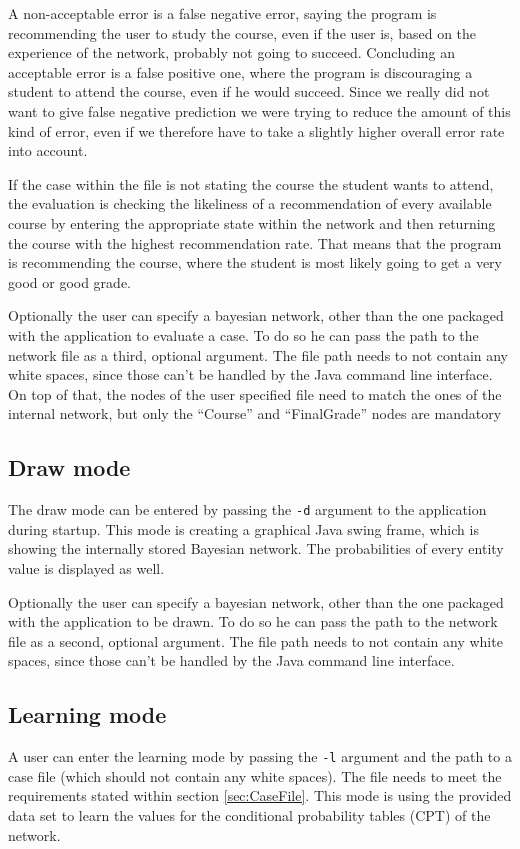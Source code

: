 \documentclass[%
	pdftex,
	oneside,        %
	11pt,           %
	parskip=half,   %
	headsepline,    %
	footsepline,    %
	abstracton,     %
	USenglish,      %
	a4paper,        %
]{report}
\begin{document}
A non-acceptable error is a false negative error, saying the program is recommending the user to study the course, even if the user is, based on the experience of the network, probably not going to succeed. Concluding an acceptable error is a false positive one, where the program is discouraging a student to attend the course, even if he would succeed. Since we really did not want to give false negative prediction we were trying to reduce the amount of this kind of error, even if we therefore have to take a slightly higher overall error rate into account.

If the case within the file is not stating the course the student wants to attend, the evaluation is checking the likeliness of a recommendation of every available course by entering the appropriate state within the network and then returning the course with the highest recommendation rate. That means that the program is recommending the course, where the student is most likely going to get a very good or good grade.

Optionally the user can specify a bayesian network, other than the one packaged with the application to evaluate a case. To do so he can pass the path to the network file as a third, optional argument. The file path needs to not contain any white spaces, since those can't be handled by the Java command line interface. On top of that, the nodes of the user specified file need to match the ones of the internal network, but only the \enquote{Course} and \enquote{FinalGrade} nodes are mandatory

\subsection{Draw mode}
The draw mode can be entered by passing the \texttt{-d} argument to the application during startup. This mode is creating a graphical Java swing frame, which is showing the internally stored Bayesian network. The probabilities of every entity value is displayed as well.

Optionally the user can specify a bayesian network, other than the one packaged with the application to be drawn. To do so he can pass the path to the network file as a second, optional argument. The file path needs to not contain any white spaces, since those can't be handled by the Java command line interface.

\subsection{Learning mode}
A user can enter the learning mode by passing the \texttt{-l} argument and the path to a case file (which should not contain any white spaces). The file needs to meet the requirements stated within section \vref{sec:CaseFile}. This mode is using the provided data set to learn the values for the conditional probability tables (CPT) of the network.
\end{document}
